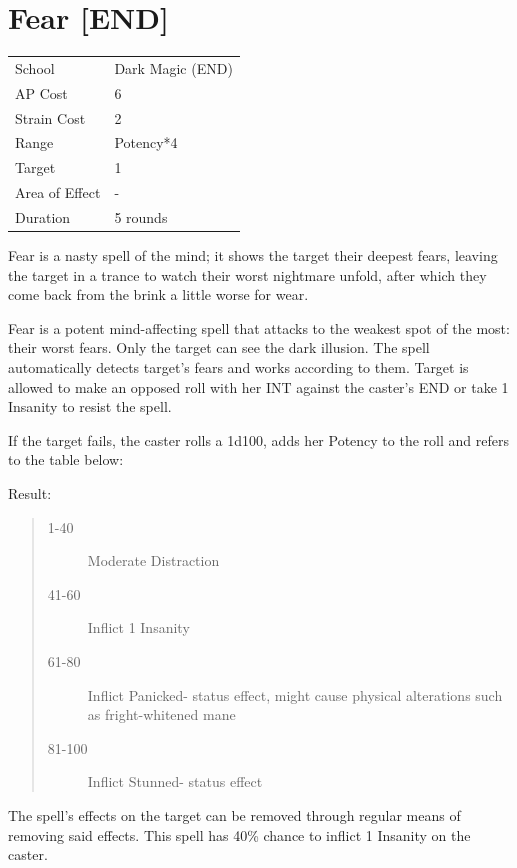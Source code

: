 \documentclass[11pt,a4paper,twocolumn]{book}
\begin{document}
\section*{Fear [END]}
{
	\begin{tabu} to 75mm{| X[l,4] | X[l,7] |}
		\hline
		School 			& Dark Magic (END)		\\
        AP Cost	      	& 6 					\\
        Strain Cost     & 2 					\\
        Range     		& Potency*4 			\\
        Target      	& 1						\\
        Area of Effect  & -  	 				\\
        Duration     	& 5 rounds 				\\ \hline
	\end{tabu}
		
}

\medskip

Fear is a nasty spell of the mind; it shows the target their deepest fears, leaving the target in a trance to watch their worst nightmare unfold, after which they come back from the brink a little worse for wear.	

Fear is a potent mind-affecting spell that attacks to the weakest spot of the most: their worst fears. Only the target can see the dark illusion. The spell automatically detects target's fears and works according to them. Target is allowed to make an opposed roll with her INT against the caster's END or take 1 Insanity to resist the spell.

If the target fails, the caster rolls a 1d100, adds her Potency to the roll and refers to the table below:

Result:
\begin{quote}
	\begin{description}
		\item [1-40]		Moderate Distraction
		\item [41-60]		Inflict 1 Insanity
		\item [61-80]		Inflict Panicked- status effect, might cause physical alterations such as fright-whitened mane
		\item [81-100]		Inflict Stunned- status effect
	\end{description}
\end{quote}

The spell's effects on the target can be removed through regular means of removing said effects.
This spell has 40\% chance to inflict 1 Insanity on the caster.
\end{document}
